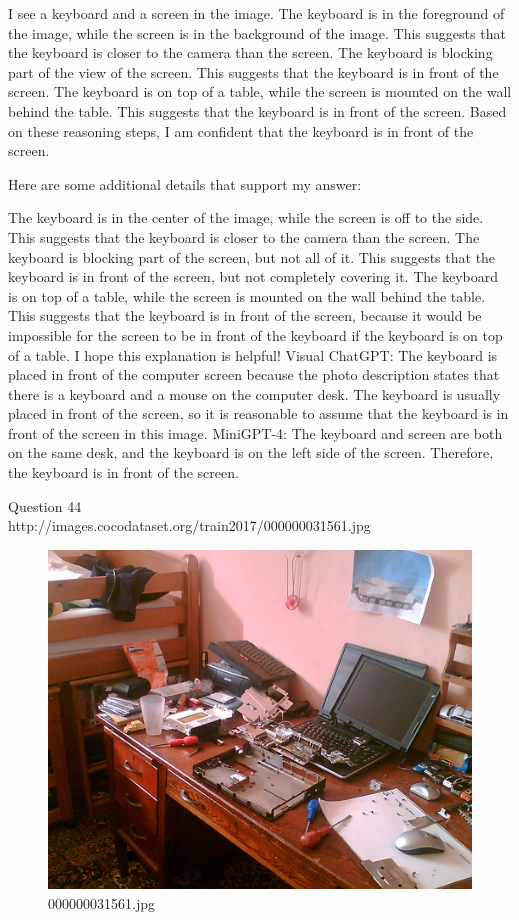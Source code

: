 \begin{enumerate}
    I see a keyboard and a screen in the image.
    The keyboard is in the foreground of the image, while the screen is in the background of the image. This suggests that the keyboard is closer to the camera than the screen.
    The keyboard is blocking part of the view of the screen. This suggests that the keyboard is in front of the screen.
    The keyboard is on top of a table, while the screen is mounted on the wall behind the table. This suggests that the keyboard is in front of the screen.
    Based on these reasoning steps, I am confident that the keyboard is in front of the screen.
    
    Here are some additional details that support my answer:
    
    The keyboard is in the center of the image, while the screen is off to the side. This suggests that the keyboard is closer to the camera than the screen.
    The keyboard is blocking part of the screen, but not all of it. This suggests that the keyboard is in front of the screen, but not completely covering it.
    The keyboard is on top of a table, while the screen is mounted on the wall behind the table. This suggests that the keyboard is in front of the screen, because it would be impossible for the screen to be in front of the keyboard if the keyboard is on top of a table.
    I hope this explanation is helpful!
    \subitem Visual ChatGPT: The keyboard is placed in front of the computer screen because the photo description states that there is a keyboard and a mouse on the computer desk. The keyboard is usually placed in front of the screen, so it is reasonable to assume that the keyboard is in front of the screen in this image.
    \subitem MiniGPT-4: The keyboard and screen are both on the same desk, and the keyboard is on the left side of the screen. Therefore, the keyboard is in front of the screen.
\end{enumerate}
Question 44\\
http://images.cocodataset.org/train2017/000000031561.jpg
\begin{figure}[h]
    \centering
    \includegraphics[width=0.8\linewidth]{../image set/hard/000000031561.jpg}
    \caption{000000031561.jpg}
\end{figure}

